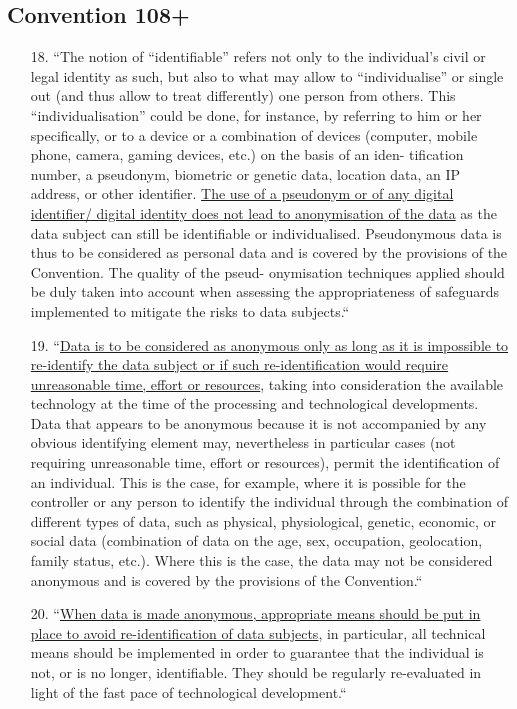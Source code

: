 \documentclass{article}
\begin{document}
  \subsection{\label{subsec:Conv108}Convention 108+}
    \begin{enumerate}
      \item[18.] ``The notion of “identifiable” refers not only to the
    individual’s civil or legal identity as such, but also to
    what may allow to “individualise” or single out (and
    thus allow to treat differently) one person from others.
    This “individualisation” could be done, for instance, by
    referring to him or her specifically, or to a device or
    a combination of devices (computer, mobile phone,
    camera, gaming devices, etc.) on the basis of an iden-
    tification number, a pseudonym, biometric or genetic
    data, location data, an IP address, or other identifier.
    \ul{The use of a pseudonym or of any digital identifier/
    digital identity does not lead to anonymisation of 
  the data} as the data subject can still be identifiable
    or individualised. Pseudonymous data is thus to be
    considered as personal data and is covered by the
    provisions of the Convention. The quality of the pseud-
    onymisation techniques applied should be duly taken
    into account when assessing the appropriateness of
    safeguards implemented to mitigate the risks to data
    subjects.``

  \item[19.] ``\ul{Data is to be considered as anonymous only as
    long as it is impossible to re-identify the data subject
    or if such re-identification would require unreasonable
  time, effort or resources}, taking into consideration the
    available technology at the time of the processing
    and technological developments. Data that appears
    to be anonymous because it is not accompanied by
    any obvious identifying element may, nevertheless
    in particular cases (not requiring unreasonable time,
    effort or resources), permit the identification of an
    individual. This is the case, for example, where it is
    possible for the controller or any person to identify
    the individual through the combination of different
    types of data, such as physical, physiological, genetic,
    economic, or social data (combination of data on the
    age, sex, occupation, geolocation, family status, etc.).
    Where this is the case, the data may not be considered
    anonymous and is covered by the provisions of the
    Convention.``

  \item[20.] ``\ul{When data is made anonymous, appropriate
    means should be put in place to avoid re-identification
  of data subjects}, in particular, all technical means
    should be implemented in order to guarantee that
    the individual is not, or is no longer, identifiable. They
    should be regularly re-evaluated in light of the fast
    pace of technological development.``\cite{Conv108+}
    \end{enumerate}
    
\end{document}
